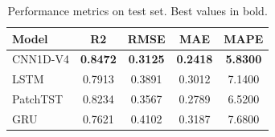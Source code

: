 \begin{table}[htbp]
\centering
\caption{Performance metrics on test set. Best values in bold.}
\label{tab:table1_metrics}
\begin{tabular}{lcccc}
\toprule
\textbf{Model} & \textbf{R2} & \textbf{RMSE} & \textbf{MAE} & \textbf{MAPE} \\
\midrule
CNN1D-V4 & \textbf{0.8472} & \textbf{0.3125} & \textbf{0.2418} & \textbf{5.8300} \\
LSTM & 0.7913 & 0.3891 & 0.3012 & 7.1400 \\
PatchTST & 0.8234 & 0.3567 & 0.2789 & 6.5200 \\
GRU & 0.7621 & 0.4102 & 0.3187 & 7.6800 \\
\bottomrule
\end{tabular}
\end{table}